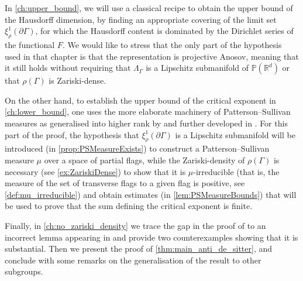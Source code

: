 \documentclass{report}
\begin{document}
In \cref{ch:upper_bound}, we will use a classical recipe to obtain the upper bound of the Hausdorff dimension, by finding an appropriate covering of the limit set $\xi_\rho^1(\partial \Gamma)$, for which the Hausdorff content is dominated by the Dirichlet series of the functional $F$.
We would like to stress that the only part of the hypothesis used in that chapter is that the representation is projective Anosov, meaning that it still holds without requiring that $\Lambda_\Gamma$ is a Lipschitz submanifold of $\mathbb P(\mathbb R^d)$ or that $\rho(\Gamma)$ is Zariski-dense.

On the other hand, to establish the upper bound of the critical exponent in \cref{ch:lower_bound},  one uses the more elaborate machinery of Patterson--Sullivan measures as generalised into higher rank by \cite{quint2002mesures} and further developed in \cite{pozzetti_anosov_2023}.
For this part of the proof, the hypothesis that $\xi_\rho^1(\partial \Gamma)$ is a Lipschitz submanifold will be introduced (in \cref{prop:PSMeasureExists}) to construct a Patterson--Sullivan measure $\mu$ over a space of partial flags, while the Zariski-density of $\rho(\Gamma)$ is necessary (see \cref{ex:ZariskiDense}) to show that it is $\mu$-irreducible (that is, the measure of the set of transverse flags to a given flag is positive, see \cref{def:mu_irreducible}) and obtain estimates (in \cref{lem:PSMeasureBounds}) that will be used to prove that the sum defining the critical exponent is finite.

Finally, in \cref{ch:no_zariski_density} we trace the gap in the proof of \cite{pozzetti_anosov_2023} to an incorrect lemma appearing in \cite{labourie_anosov_2006} and provide two counterexamples showing that it is substantial.
Then we present the proof of \cref{thm:main_anti_de_sitter}, and conclude with some remarks on the generalisation of the result to other subgroups.
\end{document}
